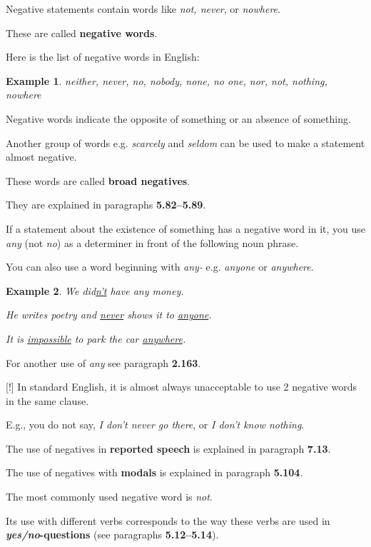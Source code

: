 \documentclass[oneside]{book}
\numberwithin{equation}{section}
\newtheorem{example}{Example}[section]
\begin{document}
Negative statements contain words like \textit{not, never}, or \textit{nowhere}.

These are called \textbf{negative words}.

%
Here is the list of negative words in English:
\begin{example}
    neither, never, no, nobody, none, no one, nor, not, nothing, nowhere
\end{example}
Negative words indicate the opposite of something or an absence of something.

%
\noindent{} Another group of words e.g. \textit{scarcely} and \textit{seldom} can be used to make a statement almost negative.

These words are called \textbf{broad negatives}.

They are explained in paragraphs \textbf{5.82--5.89}.

%
\noindent{} If a statement about the existence of something has a negative word in it, you use \textit{any} (not \textit{no}) as a determiner in front of the following noun phrase.

You can also use a word beginning with \textit{any-} e.g. \textit{anyone} or \textit{anywhere}.
\begin{example}
    We did\underline{n't} have any money.
    
    He writes poetry and \underline{never} shows it to \underline{anyone}.
    
    It is \underline{impossible} to park the car \underline{anywhere}.
\end{example}
For another use of \textit{any} see paragraph \textbf{2.163}.

%
\noindent{} [!] In standard English, it is almost always unacceptable to use 2 negative words in the same clause.

E.g., you do not say, \textit{I don't never go there}, or \textit{I don't know nothing}.

%
\noindent{} The use of negatives in \textbf{reported speech} is explained in paragraph \textbf{7.13}.

The use of negatives with \textbf{modals} is explained in paragraph \textbf{5.104}.

%
\noindent{} The most commonly used negative word is \textit{not}.

Its use with different verbs corresponds to the way these verbs are used in \textbf{\textit{yes/no}-questions} (see paragraphs \textbf{5.12--5.14}).
\end{document}
